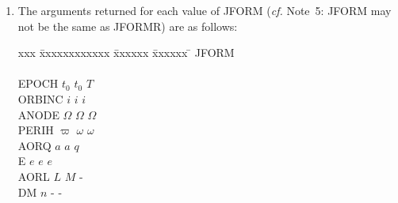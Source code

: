 \documentclass[11pt,twoside]{article}
\begin{document}
{\begin{enumerate}
        \begin{tabbing}
        xx \= xxxxxxxxxx \= xxxxxxxxxxx \= \kill
        \> JFORMR   \> JFORM   \> meaning \\ \\
        \> ~~~~~1   \> ~~~~~1  \> OK: elements are in the requested format \\
        \> ~~~~~1   \> ~~~~~2  \> never happens \\
        \> ~~~~~1   \> ~~~~~3  \> orbit not elliptical \\
        \> ~~~~~2   \> ~~~~~1  \> never happens \\
        \> ~~~~~2   \> ~~~~~2  \> OK: elements are in the requested format \\
        \> ~~~~~2   \> ~~~~~3  \> orbit not elliptical \\
        \> ~~~~~3   \> ~~~~~1  \> never happens \\
        \> ~~~~~3   \> ~~~~~2  \> never happens \\
        \> ~~~~~3   \> ~~~~~3  \> OK: elements are in the requested format
        \end{tabbing}
  \item The arguments returned for each value of JFORM ({\it cf.}\/ Note~5:
        JFORM may not be the same as JFORMR) are as follows:

        \begin{tabbing}
        xxx \= xxxxxxxxxxxx \= xxxxxx \= xxxxxx \= \kill
        \> JFORM                   \\ \\
        \> EPOCH  \> $t_0$    \> $t_0$    \> $T$ \\
        \> ORBINC \> $i$      \> $i$      \> $i$ \\
        \> ANODE  \> $\Omega$ \> $\Omega$ \> $\Omega$ \\
        \> PERIH  \> $\varpi$ \> $\omega$ \> $\omega$ \\
        \> AORQ   \> $a$      \> $a$      \> $q$ \\
        \> E      \> $e$      \> $e$      \> $e$ \\
        \> AORL   \> $L$      \> $M$      \> - \\
        \> DM     \> $n$      \> -        \> -
        \end{tabbing}


\end{enumerate}}
\end{document}
